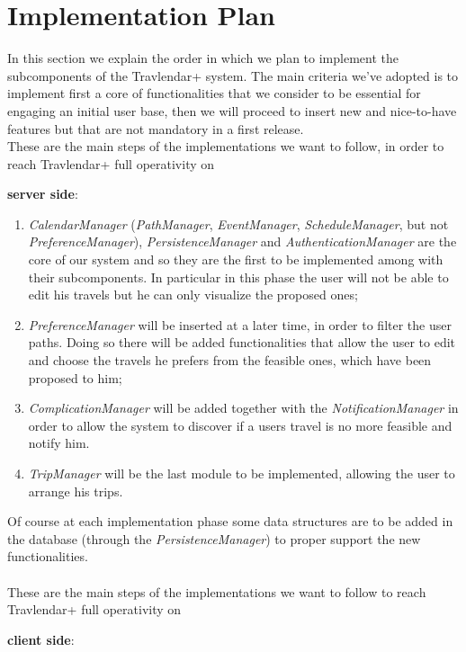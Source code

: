 \section{Implementation Plan}
In this section we explain the order in which we plan to implement the subcomponents of the Travlendar+ system.
The main criteria we've adopted is to implement first a core of functionalities that we consider to be essential for engaging an initial user base, then we will proceed to insert new and nice-to-have features but that are not mandatory in a first release.\\
These are the main steps of the implementations we want to follow, in order to reach Travlendar+ full operativity on\begin{large}
\textbf{server side}:
\end{large}
\begin{enumerate}
\item \textit{CalendarManager} (\textit{PathManager}, \textit{EventManager}, \textit{ScheduleManager}, but not \textit{PreferenceManager}), \textit{PersistenceManager} and \textit{AuthenticationManager} are the core of our system and so they are the first to be implemented among with their subcomponents. In particular in this phase the user will not be able to edit his travels but he can only visualize the proposed ones;
\item \textit{PreferenceManager} will be inserted at a later time, in order to filter the user paths. Doing so there will be added functionalities that allow the user to edit and choose the travels he prefers from the feasible ones, which have been proposed to him;
\item \textit{ComplicationManager} will be added together with the \textit{NotificationManager} in order to allow the system to discover if a users travel is no more feasible and notify him.
\item \textit{TripManager} will be the last module to be implemented, allowing the user to arrange his trips.
\end{enumerate}
Of course at each implementation phase some data structures are to be added in the database (through the \textit{PersistenceManager}) to proper support the new functionalities.\\ \\
\noindent
These are the main steps of the implementations we want to follow to reach Travlendar+ full operativity on\begin{large}
\textbf{client side}:
\end{large}
